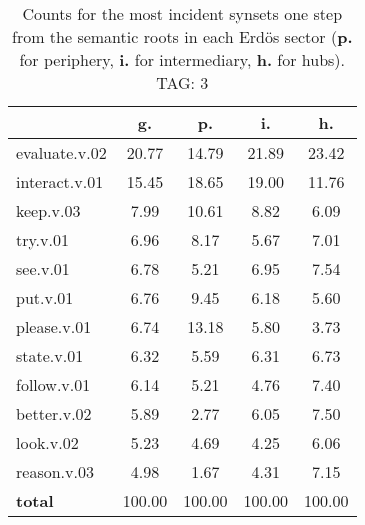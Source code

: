 \begin{table}[h!]
\begin{center}
\begin{tabular}{| l || c | c | c | c |}\hline
 & {\bf g.} & {\bf p.} & {\bf i.} & {\bf h.} \\\hline\hline
evaluate.v.02 & 20.77  & 14.79  & 21.89  & 23.42 \\\hline
interact.v.01 & 15.45  & 18.65  & 19.00  & 11.76 \\\hline
keep.v.03 & 7.99  & 10.61  & 8.82  & 6.09 \\\hline
try.v.01 & 6.96  & 8.17  & 5.67  & 7.01 \\\hline
see.v.01 & 6.78  & 5.21  & 6.95  & 7.54 \\\hline
put.v.01 & 6.76  & 9.45  & 6.18  & 5.60 \\\hline
please.v.01 & 6.74  & 13.18  & 5.80  & 3.73 \\\hline
state.v.01 & 6.32  & 5.59  & 6.31  & 6.73 \\\hline
follow.v.01 & 6.14  & 5.21  & 4.76  & 7.40 \\\hline
better.v.02 & 5.89  & 2.77  & 6.05  & 7.50 \\\hline
look.v.02 & 5.23  & 4.69  & 4.25  & 6.06 \\\hline
reason.v.03 & 4.98  & 1.67  & 4.31  & 7.15 \\\hline\hline
{{\bf total}} & 100.00  & 100.00  & 100.00  & 100.00 \\\hline
\end{tabular}
\caption{Counts for the most incident synsets one step from the semantic roots in each Erd\"os sector ({\bf p.} for periphery, {\bf i.} for intermediary, {\bf h.} for hubs). TAG: 3}
\end{center}
\end{table}